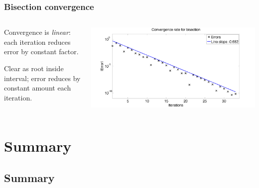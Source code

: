 \documentclass{beamer}
\begin{document}
\begin{frame}
  \frametitle{Bisection convergence}

  \begin{columns}
    \begin{column}{0.5\textwidth}
      Convergence is \emph{linear}: each iteration reduces error by
      constant factor.

      \vspace{1ex}

      Clear as root inside interval; error reduces by constant amount each
      iteration.
    \end{column}
    \begin{column}{0.5\textwidth}
      \includegraphics[width=\textwidth]{figures/BisectionConvergence}
    \end{column}
  \end{columns}

\end{frame}

\section{Summary}

\subsection{Summary}
\end{document}
